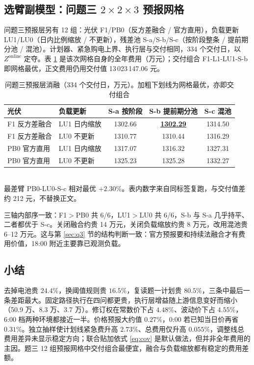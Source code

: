 \documentclass[12pt,a4paper]{ctexart}
\newcommand{\Zon}{Z^{\mathrm{online}}}
\begin{document}
\subsection{选臂副模型：问题三 $2\times2\times3$ 预报网格}

问题三预报层另有 12 组：光伏 F1/PB0（反方差融合 / 官方直用），负载更新 LU1/LU0（日内比例缩放 / 不更新），残差池 S-a/S-b/S-c（按阶段整条 / 提前期分池 / 混池）。计划器、紧急购电上界、执行层与交付相同，334 个交付日，以 $\Zon$ 定夺。表 \ref{tab:aux_q3grid} 是该次网格自身的全年费用（万元）；交付组合 F1-L1-LU1-S-b 即网格最优，正文费用仍用交付值 13\,023\,147.06 元。

\begin{table}[H]
\centering\small
\caption{问题三预报层消融（334 个交付日，万元）。加粗下划线为网格最优，亦即交付组合}
\begin{tabular}{llccc}
\toprule
光伏 & 负载更新 & S-a 按阶段 & S-b 提前期分池 & S-c 混池 \\
\midrule
F1 反方差融合 & LU1 日内缩放 & 1302.66 & \textbf{\underline{1302.29}} & 1314.50 \\
F1 反方差融合 & LU0 不更新 & 1310.77 & 1310.44 & 1316.29 \\
PB0 官方直用 & LU1 日内缩放 & 1317.07 & 1316.32 & 1327.31 \\
PB0 官方直用 & LU0 不更新 & 1325.23 & 1325.28 & 1332.27 \\
\bottomrule
\end{tabular}\\[2pt]
{\footnotesize 最差臂 PB0-LU0-S-c 相对最优 $+2.30\%$。表内数字来自同标签复跑，与交付值差约 212 元，不替换正文。}
\label{tab:aux_q3grid}
\end{table}

三轴内部序一致：F1$>$PB0 共 6/6，LU1$>$LU0 共 6/6，S-b 与 S-a 几乎持平、二者都优于 S-c。关闭融合约贵 14 万元，关闭负载缩放约贵 8 万元，改用混池贵 6--12 万元。这与第 \ref{sec:q3} 节的结构判断一致：官方预报要和持续法融合才有费用价值，18:00 附近主要靠已观测负载。

\subsection{小结}

去掉电池贵 $24.4\%$，换阈值规则贵 $16.5\%$，复读题一计划贵 $80.5\%$，三条中最后一条差距最大。固定路径执行在四问都更贵，执行层增益随上游信息变好而缩小（50.9 万、8.3 万、3.7 万）。修订权在常数价下占 $4.48\%$、波动价下占 $4.55\%$，6:00 档两种环境都接近一半。价格预报大约值 $0.27\%$，0:00 若已知当日价再省 $0.31\%$。独立抽样使计划线紧急费升高 $2.73\%$、总费用仅升高 $0.055\%$，调整线总费用差异未显示稳定方向；联合贴加依式 \eqref{eq:cov} 是默认做法，但并非全年费用的主因。题三 12 组预报网格中交付组合最便宜，融合与负载缩放都有稳定的费用差额。
\end{document}
